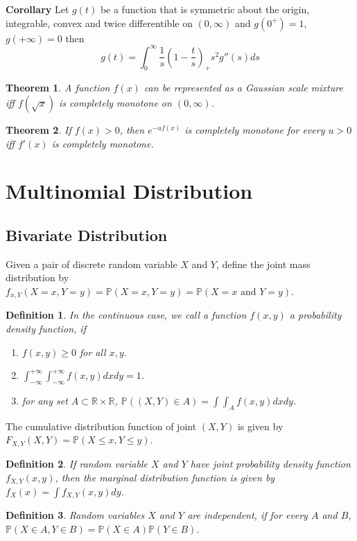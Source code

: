\documentclass[11pt]{article}
\def\BP{{\bf P}}
\def\BR{{\mathbb R}}
\def\BP{{\mathbb P}}
\newtheorem{theorem}{Theorem}[section]
\newtheorem{definition}{Definition}[section]
\begin{document}
\textbf{Corollary}
Let $g(t)$ be a function that is symmetric about the origin, integrable, convex and twice differentible on $(0, \infty)$ and $g(0^+) = 1$, $g(+\infty) = 0$ then
\[ g(t) = \int_0^{\infty} \frac{1}{s} (1-\frac{t}{s})_+ s^2 g''(s) ds \]

\begin{theorem}
A function $f(x)$ can be represented as a Gaussian scale mixture iff $f(\sqrt{x})$ is completely monotone on $(0, \infty)$.
\end{theorem}

\begin{theorem}
If $f(x) > 0$, then $e^{-uf(x)}$ is completely monotone for every $u>0$ iff $f'(x)$ is completely monotone.
\end{theorem}

\section{Multinomial Distribution}

\subsection{Bivariate Distribution}
Given a pair of discrete random variable $X$ and $Y$, define the joint mass distribution by $f_{x,Y}(X=x, Y=y) = \BP(X=x, Y=y) = \BP(X=x \text{ and } Y = y)$.

\begin{definition}
In the continuous case, we call a function $f(x,y)$ a probability density function, if
\begin{enumerate}
\item $f(x,y) \geq 0$ for all $x, y$.
\item $\int_{-\infty}^{+\infty}\int_{-\infty}^{+\infty} f(x,y) dxdy = 1$.
\item for any set $A \subset \BR \times \BR$, $\BP((X,Y) \in A) = \int\int_A f(x,y) dxdy$. 
\end{enumerate}
\end{definition}
The cumulative distribution function of joint $(X,Y)$ is given by $F_{X,Y} (X, Y) = \BP(X \leq x, Y \leq y)$.

\begin{definition}
If random variable $X$ and $Y$ have joint probability density function $f_{X,Y}(x, y)$, then the marginal distribution function is given by $f_X(x) = \int f_{X, Y}(x, y) dy$.
\end{definition}

\begin{definition}
Random variables $X$ and $Y$ are independent, if for every $A$ and $B$, $\BP(X\in A, Y\in B) = \BP(X\in A)\BP(Y\in B)$.
\end{definition}
\end{document}
